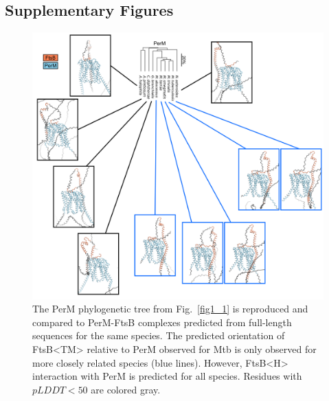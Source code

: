 \documentclass[twocolumn,pdflatex,sn-nature]{sn-jnl}%
\def\textsuperscript#1{<#1>}%
\newcommand\mtb{Mtb}
\newcommand\ftsbTM{FtsB\textsuperscript{TM}}
\newcommand\ftsbH{FtsB\textsuperscript{H}}
\begin{document}

\onecolumn

\begin{appendices}

\section{Supplementary Figures}

\begin{figure}[htb]
\centering
\includegraphics[width=1.0\textwidth]{../figures/figS1.png}
\caption{The PerM phylogenetic tree from Fig.~\ref{fig1_1} is reproduced and compared to PerM-FtsB complexes predicted from full-length sequences for the same species. The predicted orientation of \ftsbTM{} relative to PerM observed for \mtb{} is only observed for more closely related species (blue lines). However, \ftsbH{} interaction with PerM is predicted for all species. Residues with $pLDDT<50$ are colored gray.}\label{figS1}
\end{figure}

\end{appendices}
\end{document}
